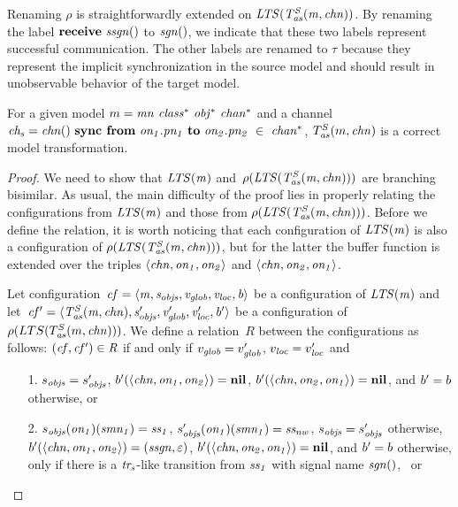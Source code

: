 \noindent
Renaming $\rho$ is straightforwardly extended on $\it{LTS}(T^S_{\it{as}}(m, \it{chn}))$.
By renaming the label $\textbf{receive}~\it{ssgn()}$ to $\it{sgn()}$, we indicate that these two labels represent successful communication.
The other labels are renamed to $\tau$ because they represent the implicit synchronization in the source model and should result in unobservable behavior of the target model.

\begin{theorem}
For a given \SLCO model $m=\it{mn}~\it{class^*}~\it{obj^*}~\it{chan^*}$ and a channel $\it{ch_s} = \it{chn}()~\textbf{sync from}~\it{on_1}.\it{pn_1} ~\textbf{to}~\it{on_2}.\it{pn_2}~\in~\it{chan^*}$, $T^S_{\it{as}}(m, \it{chn})$ is a correct model transformation.
\end{theorem}

\begin{proof}
We need to show that $\it{LTS}(m)$ and~$\rho(\it{LTS}(T^S_{\it{as}}(m, \it{chn})))$ are branching bisimilar.
As usual, the main difficulty of the proof lies in properly relating the configurations from $\it{LTS}(m)$ and those from $\rho(\it{LTS}(T^S_{\it{as}}(m, \it{chn})))$.
Before we define the relation, it is worth noticing that each configuration of $\it{LTS}(m)$ is also a configuration of $\rho(\it{LTS}(T^S_{\it{as}}(m, \it{chn})))$, but for the latter the buffer function is extended over the triples $\langle \it{chn}, \it{on_1}, \it{on_2} \rangle$ and $\langle \it{chn}, \it{on_2}, \it{on_1} \rangle$.

Let configuration~$\it{cf} = \langle m, s_{\it{objs}}, v_{\it{glob}}, v_{\it{loc}}, b \rangle$ be a configuration of $\it{LTS}(m)$ and let~$\it{cf'} = \langle T^S_{\it{as}}(m, \it{chn}), s_{\it{objs}}', v_{\it{glob}}', v_{\it{loc}}', b' \rangle$ be a configuration of $\rho(LTS(T^S_{\it{as}}(m, \it{chn})))$.
We define a relation~$R$ between the configurations as follows: $(\it{cf}, \it{cf'})\in R$ if and only if $v_{\it{glob}} = v_{\it{glob}}'$, $v_{\it{loc}} = v_{\it{loc}}'$ and
%
\begin{enumerate}
\item[1.]
$s_{\it{objs}} = s_{\it{objs}}'$,
$b'(\langle \it{chn}, \it{on_1}, \it{on_2} \rangle) = \mathbf{nil}$, $b'(\langle \it{chn}, \it{on_2}, \it{on_1} \rangle) = \mathbf{nil}$, and $b' = b$ otherwise, or

\item[2.]
$s_{\it{objs}}(\it{on_1})(\it{smn_1}) = \it{ss_1}$,
$s_{\it{objs}}'(\it{on_1})(\it{smn_1}) = \it{ss_{nw}}$,
$s_{\it{objs}} = s_{\it{objs}}'$ otherwise, \\
$b'(\langle \it{chn}, \it{on_1}, \it{on_2}\rangle) = (\it{ssgn}, \varepsilon)$,
$b'(\langle \it{chn}, \it{on_2}, \it{on_1}\rangle) = \mathbf{nil}$,
and $b' = b$ otherwise,
only if there is a $\it{tr_s}$-like transition from $\it{ss_1}$ with signal name $\it{sgn()}$, \ or


\end{enumerate}
\end{proof}
